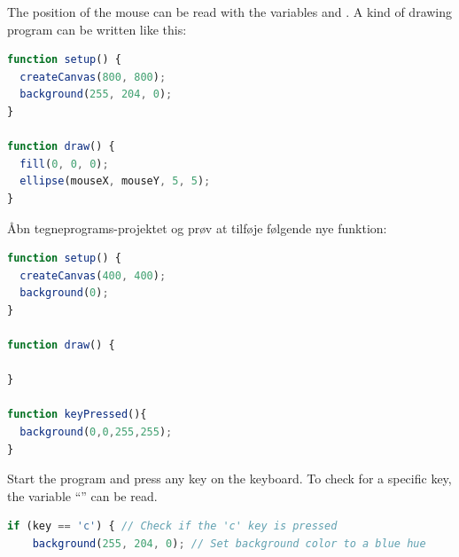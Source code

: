 \begin{exercisebox}[adjusted title=Interaction with the Mouse]
The position of the mouse can be read with the variables 
and . A kind of drawing program can be written like this:

\begin{lstlisting}[language=JavaScript]
function setup() {
  createCanvas(800, 800);
  background(255, 204, 0);
}

function draw() {
  fill(0, 0, 0);
  ellipse(mouseX, mouseY, 5, 5);
}

\end{lstlisting}

\end{exercisebox}

\begin{exercisebox}[adjusted title=Keyboard input]
Åbn tegneprograms-projektet og prøv at tilføje følgende nye funktion:

\begin{lstlisting}[language=JavaScript]
function setup() {
  createCanvas(400, 400);
  background(0);
}

function draw() {
  
}

function keyPressed(){
  background(0,0,255,255);
}
\end{lstlisting}

Start the program and press any key on the keyboard. To
check for a specific key, the variable ``'' can be read.

\begin{lstlisting}[language=JavaScript]
 if (key == 'c') { // Check if the 'c' key is pressed
    background(255, 204, 0); // Set background color to a blue hue
\end{lstlisting}
\end{exercisebox}

